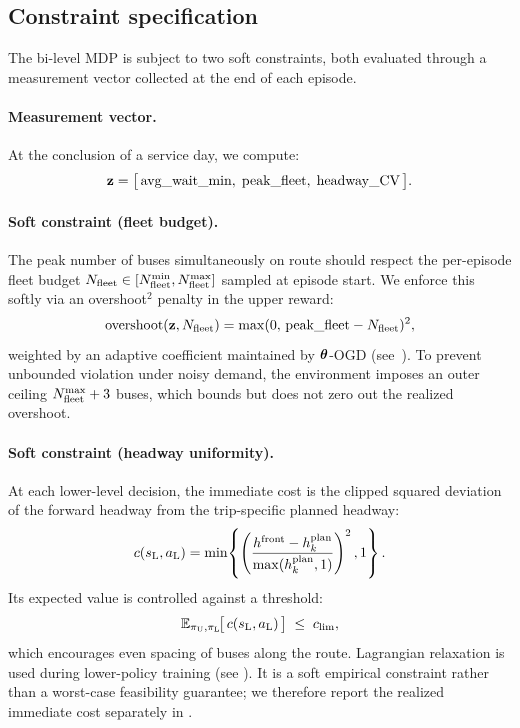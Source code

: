 \subsection{Constraint specification}
\label{sec:constraints}

The bi-level MDP is subject to two soft constraints, both evaluated through a measurement vector collected at the end of each episode.

\paragraph{Measurement vector.}
At the conclusion of a service day, we compute:
\begin{equation}
  \label{eq:measurement}
  \mathbf{z} = \bigl[\,\text{avg\_wait\_min},\;\text{peak\_fleet},\;\text{headway\_CV}\,\bigr].
\end{equation}

\paragraph{Soft constraint (fleet budget).}
The peak number of buses simultaneously on route should respect the per-episode fleet budget $N_{\mathrm{fleet}} \in [N_{\mathrm{fleet}}^{\min}, N_{\mathrm{fleet}}^{\max}]$ sampled at episode start. We enforce this softly via an overshoot$^2$ penalty in the upper reward:
\begin{equation}
  \label{eq:soft_fleet}
  \mathrm{overshoot}(\mathbf{z}, N_{\mathrm{fleet}}) = \max(0,\, \text{peak\_fleet} - N_{\mathrm{fleet}})^2,
\end{equation}
weighted by an adaptive coefficient maintained by $\boldsymbol{\theta}$-OGD (see~). To prevent unbounded violation under noisy demand, the environment imposes an outer ceiling $N_{\mathrm{fleet}}^{\max} + 3$ buses, which bounds but does not zero out the realized overshoot.

\paragraph{Soft constraint (headway uniformity).}
At each lower-level decision, the immediate cost is the clipped squared
deviation of the forward headway from the trip-specific planned headway:
\begin{equation}
  \label{eq:headway_cost}
  c(s_{\mathrm{L}},a_{\mathrm{L}})=\min\!\left\{\left(\frac{h^{\mathrm{front}}-h^{\mathrm{plan}}_k}
  {\max(h^{\mathrm{plan}}_k,1)}\right)^2,1\right\}.
\end{equation}
Its expected value is controlled against a threshold:
\begin{equation}
  \label{eq:soft_constraint}
  \mathbb{E}_{\pi_{\mathrm{U}},\pi_{\mathrm{L}}}\!\bigl[\,c(s_{\mathrm{L}},a_{\mathrm{L}})\,\bigr] \;\leq\; c_{\mathrm{lim}},
\end{equation}
which encourages even spacing of buses along the route.
Lagrangian relaxation is used during lower-policy training (see ).
It is a soft empirical constraint rather than a worst-case feasibility guarantee;
we therefore report the realized immediate cost separately in .

